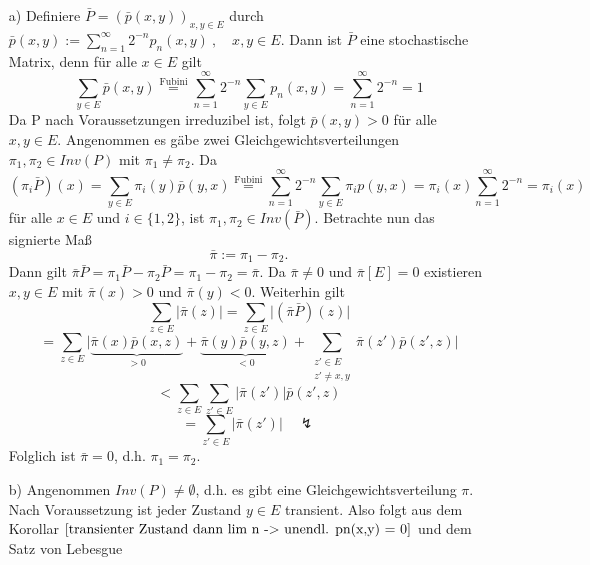 \mbox{}
\begin{itemize}
\item[a)] Definiere $\bar{P} = (\bar{p}(x,y))_{x,y \in E}$ durch $\bar{p}(x,y) := \sum_{n=1}^{\infty} 2^{-n} p_{n}(x,y) \:, \quad x,y \in E$. Dann ist $\bar{P}$ eine stochastische Matrix, denn für alle $x \in E$ gilt
\begin{equation*}
\sum_{y \in E} \bar{p} (x,y) \stackrel{\mathrm{Fubini}}{=} \sum_{n=1}^{\infty} 2^{-n} \sum_{y \in E} p_{n}(x,y) = \sum_{n=1}^{\infty} 2^{-n} = 1
\end{equation*}
Da P nach Voraussetzungen irreduzibel ist, folgt $\bar{p}(x,y)>0$ für alle $x,y \in E$. Angenommen es gäbe zwei Gleichgewichtsverteilungen $\pi_{1},\pi_{2} \in Inv(P)$ mit $\pi_{1} \neq \pi_{2}$. Da
\begin{equation*}
(\pi_{i} \bar{P})(x) = \sum_{y \in E} \pi_{i}(y) \bar{p}(y,x) \stackrel{\mathrm{Fubini}}{=} \sum_{n=1}^{\infty} 2^{-n} \sum_{y \in E} \pi_{i} p(y,x) = \pi_{i}(x) \sum_{n=1}^{\infty} 2^{-n} = \pi_{i}(x)
\end{equation*} 
für alle $x \in E$ und $i \in \lbrace 1,2 \rbrace$, ist $\pi_{1}, \pi_{2} \in Inv(\bar{P})$. Betrachte nun das signierte Maß
\begin{equation*}
\bar{\pi} := \pi_{1} - \pi_{2}.
\end{equation*}
Dann gilt $\bar{\pi} \bar{P} = \pi_{1} \bar{P} - \pi_{2} \bar{P} = \pi_{1} - \pi_{2} = \bar{\pi}$. Da $\bar{\pi} \neq 0$ und $\bar{\pi}[E]=0$ existieren $x,y \in E$ mit $\bar{\pi}(x) > 0$ und $\bar{\pi}(y) < 0$. Weiterhin gilt
\begin{equation*}
\sum_{z \in E} \vert \bar{\pi}(z) \vert = \sum_{z \in E} \vert (\bar{\pi}\bar{P})(z) \vert
\end{equation*}
\begin{equation*}
= \sum_{z \in E}\vert \underbrace{\bar{\pi}(x)\bar{p}(x,z)}_{>0} + \underbrace{\bar{\pi}(y)\bar{p}(y,z)}_{<0} +  \sum_{\substack{ z' \in E \\ z' \neq x,y } }\bar{\pi}(z')\bar{p}(z',z) \vert
\end{equation*}
\begin{equation*}
< \sum_{z \in E} \sum_{z' \in E} \vert \bar{\pi}(z') \vert \bar{p}(z',z)
\end{equation*}
\begin{equation*}
= \sum_{z' \in E} \vert \bar{\pi}(z') \vert \quad \lightning
\end{equation*}
Folglich ist $\bar{\pi}=0$, d.h. $\pi_{1} = \pi_{2}$.
\item[b)] Angenommen $Inv(P) \neq \emptyset$, d.h. es gibt eine Gleichgewichtsverteilung $\pi$. Nach Voraussetzung ist jeder Zustand $y \in E$ transient. Also folgt aus dem Korollar $\ref{transienter Zustand dann lim n -> unendl. pn(x,y) = 0}$ und dem Satz von Lebesgue

\end{itemize}
